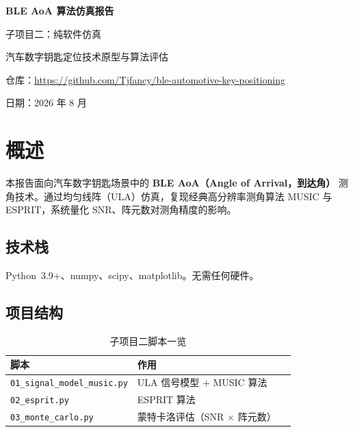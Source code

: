 \documentclass[11pt,a4paper]{article}
\newcommand{\code}[1]{\texttt{#1}}
\begin{document}
\begin{titlepage}
\centering
\vspace*{2cm}
{\Huge\bfseries BLE AoA 算法仿真报告\par}
\vspace{0.5cm}
{\Large 子项目二：纯软件仿真\par}
\vspace{1cm}
{\large 汽车数字钥匙定位技术原型与算法评估\par}
\vspace{2cm}
\begin{abstract}
本报告面向汽车数字钥匙场景中的 \textbf{BLE AoA（到达角）} 测角技术。通过均匀线阵（ULA）仿真，复现经典高分辨率测角算法 MUSIC 与 ESPRIT，系统量化 SNR、阵元数对测角精度的影响。全文覆盖信号模型、算法原理、蒙特卡洛实验与结果分析，并提供可拓展方向。
\end{abstract}
\vspace{2cm}
{\small 仓库：\url{https://github.com/Tjfancy/ble-automotive-key-positioning}\par}
{\small 日期：2026 年 8 月\par}
\end{titlepage}

\tableofcontents
\newpage

\section{概述}

本报告面向汽车数字钥匙场景中的 \textbf{BLE AoA（Angle of Arrival，到达角）} 测角技术。通过均匀线阵（ULA）仿真，复现经典高分辨率测角算法 MUSIC 与 ESPRIT，系统量化 SNR、阵元数对测角精度的影响。

\subsection*{技术栈}
Python~3.9+、numpy、scipy、matplotlib。无需任何硬件。

\subsection*{项目结构}

\begin{table}[H]
\centering
\caption{子项目二脚本一览}
\label{tab:scripts}
\begin{tabular}{llp{7cm}}
\toprule
\textbf{脚本} & \textbf{作用} \\
\midrule
\code{01\_signal\_model\_music.py} & ULA 信号模型 + MUSIC 算法 \\
\code{02\_esprit.py} & ESPRIT 算法 \\
\code{03\_monte\_carlo.py} & 蒙特卡洛评估（SNR $\times$ 阵元数） \\
\bottomrule
\end{tabular}
\end{table}
\end{document}
